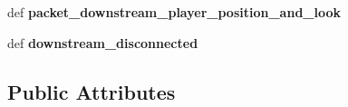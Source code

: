 \begin{DoxyCompactItemize}
\item 
\hypertarget{classMinecraftProxyEncoder_1_1MinecraftProxyBridge_a95cff10c5de7adcac5df4979a6f9380d}{def {\bfseries packet\-\_\-downstream\-\_\-player\-\_\-position\-\_\-and\-\_\-look}}\label{classMinecraftProxyEncoder_1_1MinecraftProxyBridge_a95cff10c5de7adcac5df4979a6f9380d}

\item 
\hypertarget{classMinecraftProxyEncoder_1_1MinecraftProxyBridge_aa59f2c29153f2871771c2406a0b805b4}{def {\bfseries downstream\-\_\-disconnected}}\label{classMinecraftProxyEncoder_1_1MinecraftProxyBridge_aa59f2c29153f2871771c2406a0b805b4}

\end{DoxyCompactItemize}
\subsection*{Public Attributes}
